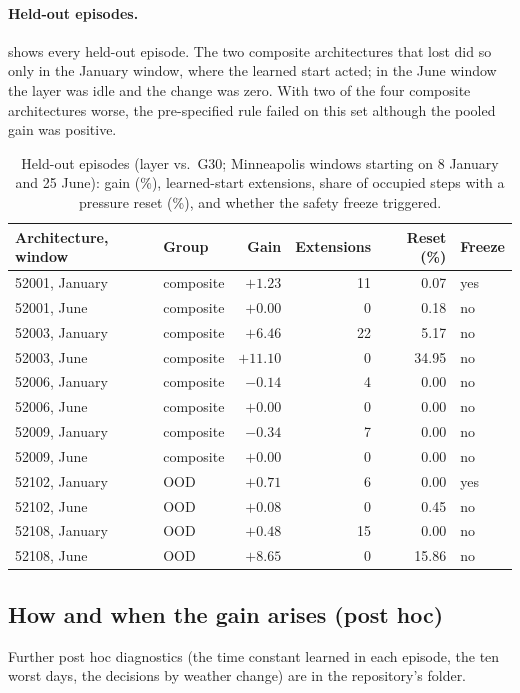 \paragraph{Held-out episodes.}  shows every held-out episode. The two composite
architectures that lost did so only in the January window, where the learned start acted; in the June window the layer
was idle and the change was zero. With two of the four composite architectures worse, the pre-specified rule failed on this
set although the pooled gain was positive.
\begin{table}[!htbp]
\centering
\caption{Held-out episodes (layer vs.\ G30; Minneapolis windows starting on 8 January and 25 June): gain (\%), learned-start extensions, share of occupied steps with a pressure reset (\%), and whether the safety freeze triggered.}
\label{tab:heldout}
\small
\begin{tabular}{llrrrl}
\toprule
Architecture, window & Group & Gain & Extensions & Reset (\%) & Freeze\\
\midrule
52001, January & composite & $+1.23$ & 11 & 0.07 & yes\\
52001, June & composite & $+0.00$ & 0 & 0.18 & no\\
52003, January & composite & $+6.46$ & 22 & 5.17 & no\\
52003, June & composite & $+11.10$ & 0 & 34.95 & no\\
52006, January & composite & $-0.14$ & 4 & 0.00 & no\\
52006, June & composite & $+0.00$ & 0 & 0.00 & no\\
52009, January & composite & $-0.34$ & 7 & 0.00 & no\\
52009, June & composite & $+0.00$ & 0 & 0.00 & no\\
52102, January & OOD & $+0.71$ & 6 & 0.00 & yes\\
52102, June & OOD & $+0.08$ & 0 & 0.45 & no\\
52108, January & OOD & $+0.48$ & 15 & 0.00 & no\\
52108, June & OOD & $+8.65$ & 0 & 15.86 & no\\
\bottomrule
\end{tabular}
\end{table}

\subsection{How and when the gain arises (post hoc)}\label{app:j-how}
Further post hoc diagnostics (the time constant learned in each episode, the ten worst days, the decisions by weather
change) are in the repository's  folder.

